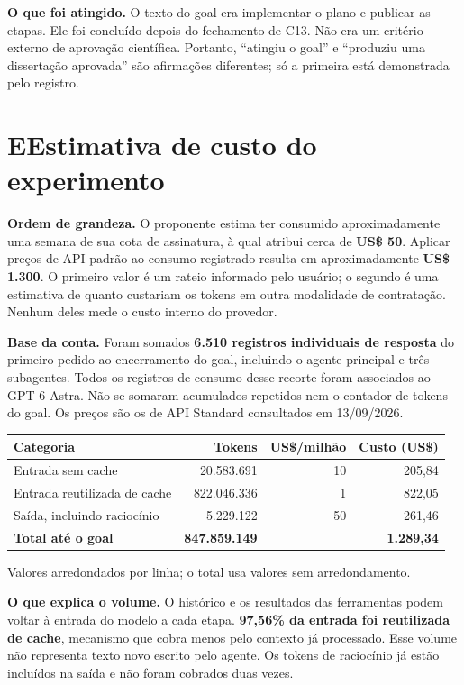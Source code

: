 \documentclass[11pt,a4paper]{article}
\newcommand{\titulo}[2]{\section*{\color{navy}#1\quad #2}}
\begin{document}
\begin{destaque}
\textbf{O que foi atingido.} O texto do goal era implementar o plano e publicar as etapas. Ele foi concluído depois do fechamento de C13. Não era um critério externo de aprovação científica. Portanto, ``atingiu o goal'' e ``produziu uma dissertação aprovada'' são afirmações diferentes; só a primeira está demonstrada pelo registro.
\end{destaque}
\newpage

\titulo{E}{Estimativa de custo do experimento}
\begin{destaque}
\textbf{Ordem de grandeza.} O proponente estima ter consumido aproximadamente uma semana de sua cota de assinatura, à qual atribui cerca de \textbf{US\$ 50}. Aplicar preços de API padrão ao consumo registrado resulta em aproximadamente \textbf{US\$ 1.300}. O primeiro valor é um rateio informado pelo usuário; o segundo é uma estimativa de quanto custariam os tokens em outra modalidade de contratação. Nenhum deles mede o custo interno do provedor.
\end{destaque}

\textbf{Base da conta.} Foram somados \textbf{6.510 registros individuais de resposta} do primeiro pedido ao encerramento do goal, incluindo o agente principal e três subagentes. Todos os registros de consumo desse recorte foram associados ao GPT-6 Astra. Não se somaram acumulados repetidos nem o contador de tokens do goal. Os preços são os de API Standard consultados em 13/09/2026.

\begin{tabularx}{\textwidth}{@{}Y r r r@{}}
\toprule
\textbf{Categoria} & \textbf{Tokens} & \textbf{US\$/milhão} & \textbf{Custo (US\$)}\\
\midrule
Entrada sem cache & 20.583.691 & 10 & 205,84\\
Entrada reutilizada de cache & 822.046.336 & 1 & 822,05\\
Saída, incluindo raciocínio & 5.229.122 & 50 & 261,46\\
\midrule
\textbf{Total até o goal} & \textbf{847.859.149} & & \textbf{1.289,34}\\
\bottomrule
\end{tabularx}
{\footnotesize Valores arredondados por linha; o total usa valores sem arredondamento.}

\textbf{O que explica o volume.} O histórico e os resultados das ferramentas podem voltar à entrada do modelo a cada etapa. \textbf{97,56\% da entrada foi reutilizada de cache}, mecanismo que cobra menos pelo contexto já processado. Esse volume não representa texto novo escrito pelo agente. Os tokens de raciocínio já estão incluídos na saída e não foram cobrados duas vezes.
\end{document}
